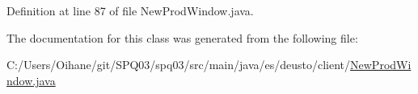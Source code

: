 Definition at line 87 of file New\+Prod\+Window.\+java.



The documentation for this class was generated from the following file\+:\begin{DoxyCompactItemize}
\item 
C\+:/\+Users/\+Oihane/git/\+S\+P\+Q03/spq03/src/main/java/es/deusto/client/\hyperlink{_new_prod_window_8java}{New\+Prod\+Window.\+java}\end{DoxyCompactItemize}
